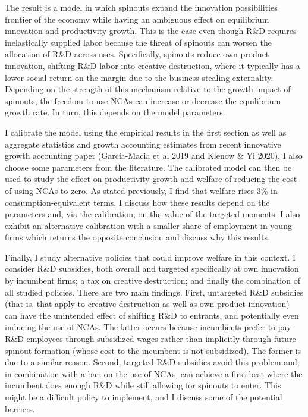 \documentclass[11pt,english]{article}
\begin{document}
The result is a model in which spinouts expand the innovation possibilities frontier of the economy while having an ambiguous effect on equilibrium innovation and productivity growth. This is the case even though R\&D requires inelastically supplied labor because the threat of spinouts can worsen the allocation of R\&D across uses. Specifically, spinouts reduce own-product innovation, shifting R\&D labor into creative destruction, where it typically has a lower social return on the margin due to the business-stealing externality. Depending on the strength of this mechanism relative to the growth impact of spinouts, the freedom to use NCAs can increase or decrease the equilibrium growth rate. In turn, this depends on the model parameters. 

I calibrate the model using the empirical results in the first section as well as aggregate statistics and growth accounting estimates from recent innovative growth accounting paper (Garcia-Macia et al 2019 and Klenow \& Yi 2020). I also choose some parameters from the literature. The calibrated model can then be used to study the effect on productivity growth and welfare of reducing the cost of using NCAs to zero. As stated previously, I find that welfare rises 3\% in consumption-equivalent terms. I discuss how these results depend on the parameters and, via the calibration, on the value of the targeted moments. I also exhibit an alternative calibration with a smaller share of employment in young firms which returns the opposite conclusion and discuss why this results.

Finally, I study alternative policies that could improve welfare in this context. I consider R\&D subsidies, both overall and targeted specifically at own innovation by incumbent firms; a tax on creative destruction; and finally the combination of all studied policies. There are two main findings. First, untargeted R\&D subsidies (that is, that apply to creative destruction as well as own-product innovation) can have the unintended effect of shifting R\&D to entrants, and potentially even inducing the use of NCAs. The latter occurs because incumbents prefer to pay R\&D employees through subsidized wages rather than implicitly through future spinout formation (whose cost to the incumbent is not subsidized). The former is due to a similar reason. Second, targeted R\&D subsidies avoid this problem and, in combination with a ban on the use of NCAs, can achieve a first-best where the incumbent does enough R\&D while still allowing for spinouts to enter. This might be a difficult policy to implement, and I discuss some of the potential barriers.
\end{document}
